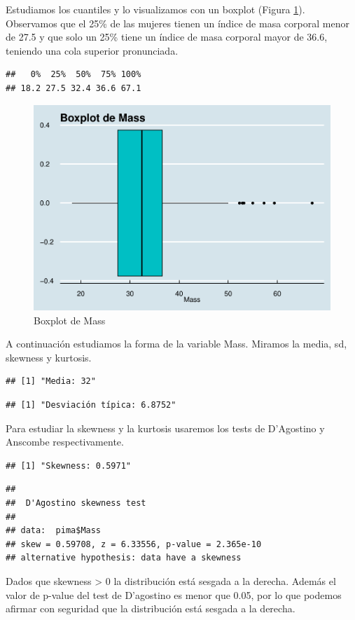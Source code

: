 \documentclass[
]{article}
\begin{document}
Estudiamos los cuantiles y lo visualizamos con un boxplot (Figura
\ref{fig:box_mass}). Observamos que el 25\% de las mujeres tienen un
índice de masa corporal menor de 27.5 y que solo un 25\% tiene un índice
de masa corporal mayor de 36.6, teniendo una cola superior pronunciada.

\begin{verbatim}
##   0%  25%  50%  75% 100% 
## 18.2 27.5 32.4 36.6 67.1
\end{verbatim}

\begin{figure}

{\centering \includegraphics[width=0.5\linewidth]{pima-clasificacion_files/figure-latex/box_mass-1} 

}

\caption{Boxplot de Mass}\label{fig:box_mass}
\end{figure}

A continuación estudiamos la forma de la variable Mass. Miramos la
media, sd, skewness y kurtosis.

\begin{verbatim}
## [1] "Media: 32"
\end{verbatim}

\begin{verbatim}
## [1] "Desviación típica: 6.8752"
\end{verbatim}

Para estudiar la skewness y la kurtosis usaremos los tests de D'Agostino
y Anscombe respectivamente.

\begin{verbatim}
## [1] "Skewness: 0.5971"
\end{verbatim}

\begin{verbatim}
## 
##  D'Agostino skewness test
## 
## data:  pima$Mass
## skew = 0.59708, z = 6.33556, p-value = 2.365e-10
## alternative hypothesis: data have a skewness
\end{verbatim}

Dados que skewness \textgreater{} 0 la distribución está sesgada a la
derecha. Además el valor de p-value del test de D'agostino es menor que
0.05, por lo que podemos afirmar con seguridad que la distribución está
sesgada a la derecha.
\end{document}

